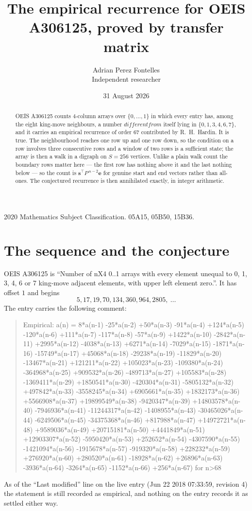 \documentclass[11pt,a4paper]{article}
\title{The empirical recurrence for OEIS A306125, proved by transfer matrix}
\author{Adrian Perez Fontelles\\ \small Independent researcher}
\date{31 August 2026}
\theoremstyle{plain}
\theoremstyle{definition}
\begin{document}
\maketitle

\begin{abstract}
OEIS A306125 counts $4$-column arrays over $\{0,\dots,1\}$ in which every entry has,
among the eight king-move neighbours, a number $different from$ itself lying in $\{0,1,3,4,6,7\}$, and it carries an empirical
recurrence of order $67$ contributed by R.~H.~Hardin. It is true. The neighbourhood
reaches one row up and one row down, so the condition on a row involves three consecutive
rows and a window of two rows is a sufficient state; the array is then a walk in a digraph
on $S=256$ vertices. Unlike a plain walk count the boundary rows matter here --- the first
row has nothing above it and the last nothing below --- so the count is
$\mathbf{s}^{\!\top}P^{\,n-2}\mathbf{e}$ for genuine start and end vectors rather than
all-ones. The conjectured recurrence is then annihilated exactly, in integer arithmetic.
\end{abstract}

\noindent\small 2020 Mathematics Subject Classification. 05A15, 05B50, 15B36.\normalsize

\section{The sequence and the conjecture}

OEIS A306125 is ``Number of nX4 0..1 arrays with every element unequal to 0, 1, 3, 4, 6 or 7 king-move adjacent elements, with upper left element zero.''. It has offset
$1$ and begins
\[
5, 17, 19, 70, 134, 360, 964, 2805,\ \dots
\]
The entry carries the following comment:
\begin{quote}\small
Empirical: a(n) = 8*a(n-1) -25*a(n-2) +50*a(n-3) -91*a(n-4) +124*a(n-5) -120*a(n-6) +111*a(n-7) -117*a(n-8) -57*a(n-9) +1422*a(n-10) -2842*a(n-11) +2995*a(n-12) -4038*a(n-13) +6271*a(n-14) -7029*a(n-15) -1871*a(n-16) -15749*a(n-17) +45068*a(n-18) -29238*a(n-19) -11829*a(n-20) -13467*a(n-21) +121211*a(n-22) +105023*a(n-23) -109380*a(n-24) -364968*a(n-25) +909532*a(n-26) -489713*a(n-27) +105583*a(n-28) -1369411*a(n-29) +1850541*a(n-30) -420304*a(n-31) -5805132*a(n-32) +497842*a(n-33) -3558245*a(n-34) +6905661*a(n-35) +1832173*a(n-36) +5566908*a(n-37) +19899549*a(n-38) -9420347*a(n-39) +14803578*a(n-40) -7946936*a(n-41) -11244317*a(n-42) -1408955*a(n-43) -30465026*a(n-44) -6249506*a(n-45) -34375368*a(n-46) +817988*a(n-47) +14972721*a(n-48) +9589036*a(n-49) +20715181*a(n-50) +4441849*a(n-51) +12903307*a(n-52) -5950420*a(n-53) +252652*a(n-54) -4307590*a(n-55) -1421094*a(n-56) -1915678*a(n-57) -919320*a(n-58) +228232*a(n-59) +276920*a(n-60) +280520*a(n-61) -18928*a(n-62) +26896*a(n-63) -3936*a(n-64) -3264*a(n-65) -1152*a(n-66) +256*a(n-67) for n>68
\end{quote}
As of the ``Last modified'' line on the live entry (Jun 22 2018 07:33:59, revision
4) the statement is still recorded as empirical, and nothing on the entry
records it as settled either way.
\end{document}
